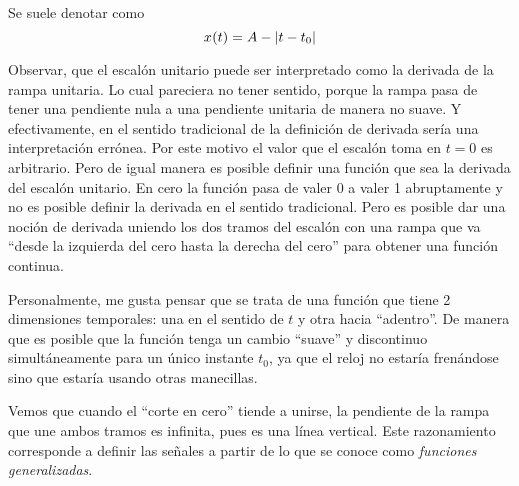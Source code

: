 
Se suele denotar como
\begin{equation*}
    \fx[x]{t} = A - \norm{t-t_0}
\end{equation*}

\begin{center}
    \def\svgwidth{0.8\linewidth}
    
\end{center}


\begin{center}
    \def\svgwidth{0.8\linewidth}
    
\end{center}

Observar, que el escalón unitario puede ser interpretado como la derivada de la rampa unitaria.
Lo cual pareciera no tener sentido, porque la rampa pasa de tener una pendiente nula a una pendiente unitaria de manera no suave.
Y efectivamente, en el sentido tradicional de la definición de derivada sería una interpretación errónea.
Por este motivo el valor que el escalón toma en $t=0$ es arbitrario.
Pero de igual manera es posible definir una función que sea la derivada del escalón unitario.
En cero la función pasa de valer 0 a valer 1 abruptamente y no es posible definir la derivada en el sentido tradicional.
Pero es posible dar una noción de derivada uniendo los dos tramos del escalón con una rampa que va ``desde la izquierda del cero hasta la derecha del cero'' para obtener una función continua.

\begin{center}
    \def\svgwidth{0.6\linewidth}
    
\end{center}

Personalmente, me gusta pensar que se trata de una función que tiene 2 dimensiones temporales: una en el sentido de $t$ y otra hacia ``adentro''.
De manera que es posible que la función tenga un cambio ``suave'' y discontinuo simultáneamente para un único instante $t_0$, ya que el reloj no estaría frenándose sino que estaría usando otras manecillas.

Vemos que cuando el ``corte en cero'' tiende a unirse, la pendiente de la rampa que une ambos tramos es infinita, pues es una línea vertical.
Este razonamiento corresponde a definir las señales a partir de lo que se conoce como \emph{funciones generalizadas}.

